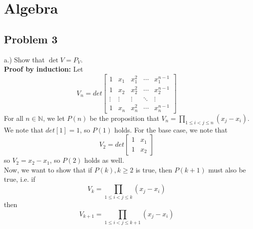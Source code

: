 \documentclass[12pt]{article}
\begin{document}
\section{Algebra}

\subsection*{Problem 3}

a.) Show that $\det V = P_V$. \\ 

\textbf{Proof by induction:} Let 
$$V_n = det \begin{bmatrix} 1 & x_1 & x_1^2 & \cdots & x_1^{n-1} \\ 1 &x_2 & x_2^2 & \cdots & x_2^{n-1} \\ \vdots & \vdots & \vdots & \ddots & \vdots \\ 1 &x_n & x_n^2 & \cdots & x_n^{n-1} \end{bmatrix}$$
For all $n \in \mathbb{N}$, we let $P(n)$ be the proposition that $V_n = \prod_{1 \leq i < j \leq n} (x_j - x_i)$.
We note that $det [1] = 1$, so $P(1)$ holds. For the base case, we note that 
$$V_2 = det \begin{bmatrix} 1 & x_1 \\ 1 & x_2 \end{bmatrix}$$
so $V_2 = x_2 - x_1$, so $P(2)$ holds as well. \\

Now, we want to show that if $P(k), k \geq 2$ is true, then $P(k+1)$ must also be true, i.e. if
$$V_k = \prod_{1 \leq i < j \leq k} (x_j - x_i)$$
then
$$V_{k+1} = \prod_{1 \leq i < j \leq k+1} (x_j - x_i)$$\\
\end{document}
